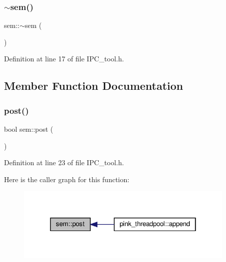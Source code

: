 \subsubsection{\texorpdfstring{$\sim$sem()}{~sem()}}
{\footnotesize\ttfamily sem\+::$\sim$sem (\begin{DoxyParamCaption}{ }\end{DoxyParamCaption})\hspace{0.3cm}{\ttfamily [inline]}}



Definition at line 17 of file I\+P\+C\+\_\+tool.\+h.



\subsection{Member Function Documentation}
\mbox{\label{classsem_a258d9983b317cba4b528f6204545f849}} 
\subsubsection{\texorpdfstring{post()}{post()}}
{\footnotesize\ttfamily bool sem\+::post (\begin{DoxyParamCaption}{ }\end{DoxyParamCaption})\hspace{0.3cm}{\ttfamily [inline]}}



Definition at line 23 of file I\+P\+C\+\_\+tool.\+h.

Here is the caller graph for this function\+:\nopagebreak
\begin{figure}[H]
\begin{center}
\leavevmode
\includegraphics[width=298pt]{classsem_a258d9983b317cba4b528f6204545f849_icgraph}
\end{center}
\end{figure}
\mbox{\label{classsem_a0195e3b2273cb8d2c814778b0521e847}} 
